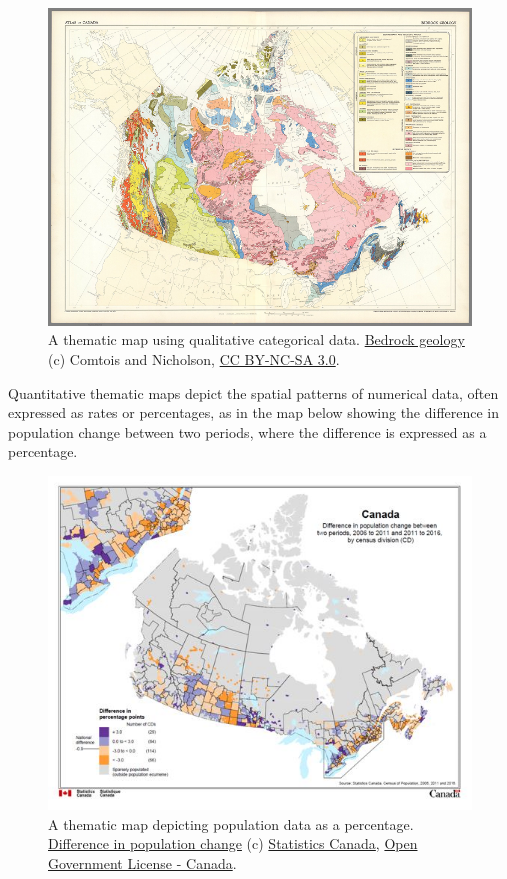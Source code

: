 \documentclass[
]{book}
\begin{document}
\begin{figure}
\centering
\includegraphics{images/17-geology.png}
\caption{A thematic map using qualitative categorical data. \href{https://www.davidrumsey.com/luna/servlet/detail/RUMSEY~8~1~323176~90092279:-16--Bedrock-geology-\#}{Bedrock geology} (c) Comtois and Nicholson, \href{https://creativecommons.org/licenses/by-nc-sa/3.0/}{CC BY-NC-SA 3.0}.}
\end{figure}

Quantitative thematic maps depict the spatial patterns of numerical data, often expressed as rates or percentages, as in the map below showing the difference in population change between two periods, where the difference is expressed as a percentage.

\begin{figure}
\centering
\includegraphics{images/17-population.png}
\caption{A thematic map depicting population data as a percentage. \href{https://www150.statcan.gc.ca/n1/pub/92-195-x/2016001/other-autre/theme/theme-eng.htm}{Difference in population change} (c) \href{https://www-statcan-gc-ca.eu1.proxy.openathens.net/eng/about/about?MM=as}{Statistics Canada}, \href{https://open.canada.ca/en/open-government-licence-canada}{Open Government License - Canada}.}
\end{figure}
\end{document}
